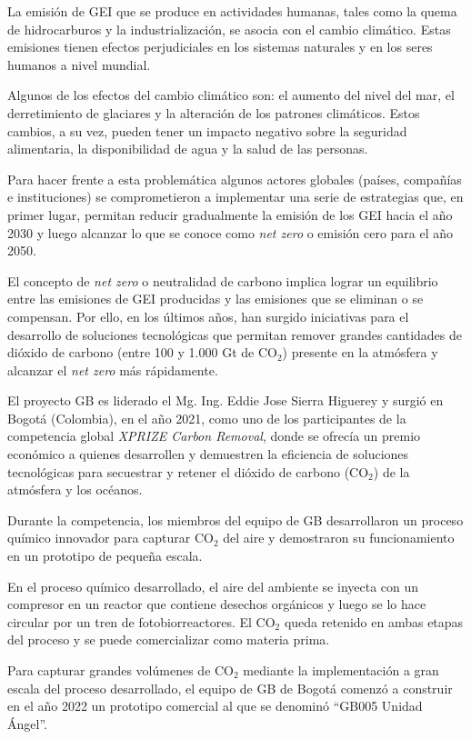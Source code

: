 \documentclass[
11pt, %
]{charter}
\begin{document}
La emisión de GEI que se produce en actividades humanas, tales como la quema de hidrocarburos y la industrialización, se asocia con el cambio climático. Estas emisiones tienen efectos perjudiciales en los sistemas naturales y en los seres humanos a nivel mundial. 

Algunos de los efectos del cambio climático son: el aumento del nivel del mar, el derretimiento de glaciares y la alteración de los patrones climáticos. Estos cambios, a su vez, pueden tener un impacto negativo sobre la seguridad alimentaria, la disponibilidad de agua y la salud de las personas. 

Para hacer frente a esta problemática algunos actores globales (países, compañías e instituciones) se comprometieron a implementar una serie de estrategias que, en primer lugar, permitan reducir gradualmente la emisión de los GEI hacia el año 2030 y luego alcanzar lo que se conoce como \textit{net zero} o emisión cero para el año 2050. 

El concepto de \textit{net zero} o neutralidad de carbono implica lograr un equilibrio entre las emisiones de GEI producidas y las emisiones que se eliminan o se compensan. Por ello, en los últimos años, han surgido iniciativas para el desarrollo de soluciones tecnológicas que permitan remover grandes cantidades de dióxido de carbono (entre 100 y 1.000 Gt de CO$_2$) presente en la atmósfera y alcanzar el \textit{net zero} más rápidamente.

El proyecto GB es liderado el Mg. Ing. Eddie Jose Sierra Higuerey y surgió en Bogotá (Colombia), en el año 2021, como uno de los participantes de la competencia global \textit{XPRIZE Carbon Removal}, donde se ofrecía un premio económico a quienes desarrollen y demuestren la eficiencia de soluciones tecnológicas para secuestrar y retener el dióxido de carbono (CO$_2$) de la atmósfera y los océanos.

Durante la competencia, los miembros del equipo de GB desarrollaron un proceso químico innovador para capturar CO$_2$ del aire y demostraron su funcionamiento en un prototipo de pequeña escala. 

En el proceso químico desarrollado, el aire del ambiente se inyecta con un compresor en un reactor que contiene desechos orgánicos y luego se lo hace circular por un tren de fotobiorreactores. El CO$_2$ queda retenido en ambas etapas del proceso y se puede comercializar como materia prima.

Para capturar grandes volúmenes de CO$_2$ mediante la implementación a gran escala del proceso desarrollado, el equipo de GB de Bogotá comenzó a construir en el año 2022 un prototipo comercial al que se denominó “GB005 Unidad Ángel”. 
\end{document}

